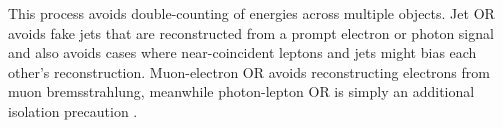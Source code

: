 \begin{sloppypar}
This process avoids double-counting of energies across multiple objects.  Jet
\ac{OR} avoids fake jets that are reconstructed from a prompt electron or photon
signal and also avoids cases where near-coincident leptons and jets might bias
each other's reconstruction. Muon-electron \ac{OR} avoids reconstructing
electrons from muon bremsstrahlung, meanwhile photon-lepton \ac{OR} is simply an
additional isolation precaution \cite{Adams2015}.
\end{sloppypar}
